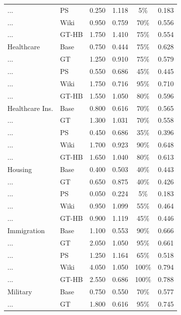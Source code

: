 \documentclass[12pt]{article}
\begin{document}
\begin{longtable}{llcccc}
    ...              & PS   & 0.250 & 1.118 & 5\% & 0.183 \\
    ...              & Wiki & 0.950 & 0.759 & 70\% & 0.556 \\
    ...              & GT-HB & 1.750 & 1.410 & 75\% & 0.554 \\
    \addlinespace
    Healthcare       & Base & 0.750 & 0.444 & 75\% & 0.628 \\
    ...              & GT   & 1.250 & 0.910 & 75\% & 0.579 \\
    ...              & PS   & 0.550 & 0.686 & 45\% & 0.445 \\
    ...              & Wiki & 1.750 & 0.716 & 95\% & 0.710 \\
    ...              & GT-HB & 1.550 & 1.050 & 80\% & 0.596 \\
    \addlinespace
    Healthcare Ins.  & Base & 0.800 & 0.616 & 70\% & 0.565 \\
    ...              & GT   & 1.300 & 1.031 & 70\% & 0.558 \\
    ...              & PS   & 0.450 & 0.686 & 35\% & 0.396 \\
    ...              & Wiki & 1.700 & 0.923 & 90\% & 0.648 \\
    ...              & GT-HB & 1.650 & 1.040 & 80\% & 0.613 \\
    \addlinespace
    Housing          & Base & 0.400 & 0.503 & 40\% & 0.443 \\
    ...              & GT   & 0.650 & 0.875 & 40\% & 0.426 \\
    ...              & PS   & 0.050 & 0.224 & 5\% & 0.183 \\
    ...              & Wiki & 0.950 & 1.099 & 55\% & 0.464 \\
    ...              & GT-HB & 0.900 & 1.119 & 45\% & 0.446 \\
    \addlinespace
    Immigration      & Base & 1.100 & 0.553 & 90\% & 0.666 \\
    ...              & GT   & 2.050 & 1.050 & 95\% & 0.661 \\
    ...              & PS   & 1.250 & 1.164 & 65\% & 0.518 \\
    ...              & Wiki & 4.050 & 1.050 & 100\% & 0.794 \\
    ...              & GT-HB & 2.550 & 0.686 & 100\% & 0.788 \\
    \addlinespace
    Military         & Base & 0.750 & 0.550 & 70\% & 0.577 \\
    ...              & GT   & 1.800 & 0.616 & 95\% & 0.745 \\

\end{longtable}
\end{document}
